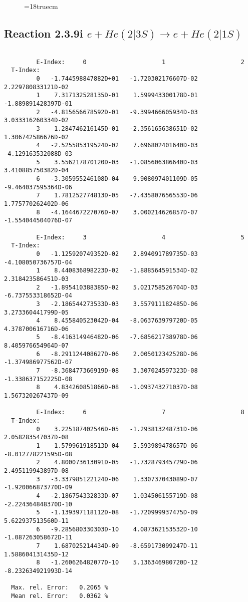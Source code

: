 \begin{figure} \label{2.3.9h}
\epsfxsize=18truecm
\end{figure}
\newpage



\subsection{
Reaction 2.3.9i $ e + He(2|3S) \rightarrow e + He(2|1S) $
}


\begin{verbatim}

         E-Index:     0                     1                     2
  T-Index:
         0   -1.744598847882D+01   -1.720302176607D-02    2.229780833121D-02
         1    7.317132528135D-01    1.599943300178D-01   -1.889891428397D-01
         2   -4.815656678592D-01   -9.399466605934D-03    3.033316260334D-02
         3    1.284746216145D-01   -2.356165638651D-02    1.306742586676D-02
         4   -2.525585319524D-02    7.696802401640D-03   -4.129163532088D-03
         5    3.556217870120D-03   -1.085606386640D-03    3.410885750382D-04
         6   -3.305955246108D-04    9.908097401109D-05   -9.464037595364D-06
         7    1.781252774813D-05   -7.435807656553D-06    1.775770262402D-06
         8   -4.164467227076D-07    3.000214626857D-07   -1.554044504076D-07

         E-Index:     3                     4                     5
  T-Index:
         0   -1.125920749352D-02    2.894091789735D-03   -4.108050736757D-04
         1    8.440836898223D-02   -1.888564591534D-02    2.318423586451D-03
         2   -1.895410388385D-02    5.021758526704D-03   -6.737553318652D-04
         3   -2.186544273533D-03    3.557911182485D-06    3.273360441799D-05
         4    8.455840523042D-04   -8.063763979720D-05    4.378700616716D-06
         5   -8.416314946482D-06   -7.685621738978D-06    8.405976654964D-07
         6   -8.291124408627D-06    2.005012342528D-06   -1.374986977562D-07
         7   -8.368477366919D-08    3.307024597323D-08   -1.338637152225D-08
         8    4.834260851866D-08   -1.093743271037D-08    1.567320267437D-09

         E-Index:     6                     7                     8
  T-Index:
         0    3.225187402546D-05   -1.293813248731D-06    2.058283547037D-08
         1   -1.579961918513D-04    5.593989478657D-06   -8.012778221595D-08
         2    4.800073613091D-05   -1.732879345729D-06    2.495119943897D-08
         3   -3.337985122124D-06    1.330737043089D-07   -1.920066873770D-09
         4   -2.186754332833D-07    1.034506155719D-08   -2.224364848370D-10
         5   -1.139397118112D-08   -1.720999937475D-09    5.622937513560D-11
         6   -9.285680330303D-10    4.087362153532D-10   -1.087263058672D-11
         7    1.687025214434D-09   -8.659173099247D-11    1.588604131435D-12
         8   -1.260626482077D-10    5.136346980720D-12   -8.232634921993D-14

  Max. rel. Error:   0.2065 %
  Mean rel. Error:   0.0362 %


\end{verbatim}
